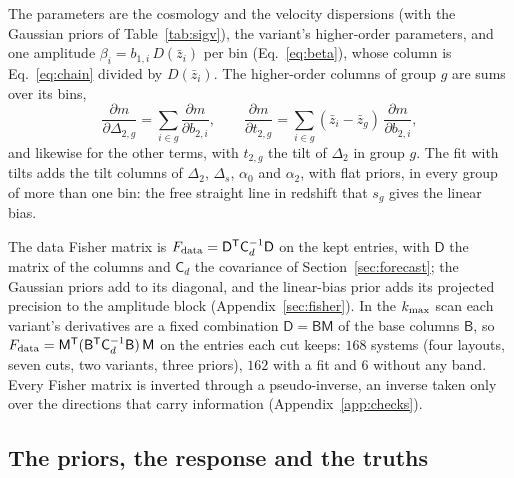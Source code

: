 \documentclass[11pt]{article}
\newcommand{\T}{^{\mathsf{T}}}
\newcommand{\kmax}{k_{\rm max}}
\begin{document}
The parameters are the cosmology and the velocity dispersions (with
the Gaussian priors of Table~\ref{tab:sigv}), the variant's
higher-order parameters, and one amplitude
$\beta_i = b_{1,i}\,D(\bar{z}_i)$ per bin (Eq.~\eqref{eq:beta}), whose
column is Eq.~\eqref{eq:chain} divided by $D(\bar{z}_i)$.  The
higher-order columns of group $g$ are sums over its bins,
\begin{equation}
  \frac{\partial m}{\partial \Delta_{2,g}}
  = \sum_{i \in g} \frac{\partial m}{\partial b_{2,i}} ,
  \qquad
  \frac{\partial m}{\partial t_{2,g}}
  = \sum_{i \in g} (\bar{z}_i - \bar{z}_g)\,
    \frac{\partial m}{\partial b_{2,i}} ,
  \label{eq:hocolumns}
\end{equation}
and likewise for the other terms, with $t_{2,g}$ the tilt of
$\Delta_2$ in group $g$.  The fit with tilts adds the tilt columns of
$\Delta_2$, $\Delta_s$, $\alpha_0$ and $\alpha_2$, with flat priors,
in every group of more than one bin: the free straight line in
redshift that $s_g$ gives the linear bias.

The data Fisher matrix is
$F_{\rm data} = \mathsf{D}\T \mathsf{C}_d^{-1} \mathsf{D}$ on the kept
entries, with $\mathsf{D}$ the matrix of the columns and $\mathsf{C}_d$
the covariance of Section~\ref{sec:forecast}; the Gaussian priors add
to its diagonal, and the linear-bias prior adds its projected
precision to the amplitude block (Appendix~\ref{sec:fisher}).  In the
$\kmax$ scan each variant's derivatives are a fixed combination
$\mathsf{D} = \mathsf{B}\mathsf{M}$ of the base columns $\mathsf{B}$,
so $F_{\rm data} = \mathsf{M}\T (\mathsf{B}\T \mathsf{C}_d^{-1}
\mathsf{B})\,\mathsf{M}$ on the entries each cut keeps: $168$ systems
(four layouts, seven cuts, two variants, three priors), $162$ with a
fit and $6$ without any band.  Every Fisher matrix is inverted
through a pseudo-inverse, an inverse taken only over the directions
that carry information (Appendix~\ref{app:checks}).

\subsection{The priors, the response and the truths}
\label{sec:ladderimpl}
\end{document}
